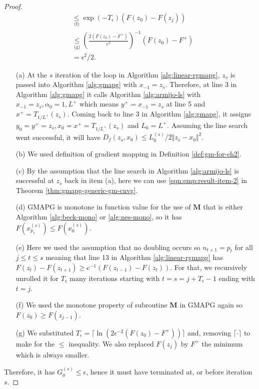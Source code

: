\documentclass[12pt]{report}
\begin{document}
\begin{proof}
{\begin{align*}
                &\underset{\text{(f)}}{\le} \exp(-T_\epsilon)(F(z_{0}) - F(z_j))
                \\
                &\underset{\text{(g)}}{\le} \left(
                    \frac{2(F(z_0) - F^+)}{\epsilon^2}
                \right)^{-1}(F(z_0) - F^+) 
                \\
                &= \epsilon^2/2.
            \end{align*}
            }
            \begin{enumerate}
                \item [(a)] At the $s$ iteration of the loop in Algorithm \ref{alg:linear-rgmapg}, $z_s$ is passed into Algorithm \ref{alg:gmapg} with $x_{-1} = z_s$. Therefore, at line 3 in Algorithm \ref{alg:gmapg} it calls Algorithm \ref{alg:armijo-ls} with $x_{-1} = z_s, \alpha_0 = 1, L^+$ which means $y^+ = x_{-1} = z_s$ at line 5 and $x^+ = T_{1/L^+}(z_s)$. Coming back to line 3 in Algorithm \ref{alg:gmapg}, it assigns $y_0 = y^+ = z_s, x_0 = x^+ = T_{1/L^+}(z_s)$ and $L_0 = L^+$. Assuming the line search went successful, it will have $D_f(z_s, x_0) \le L^{(s)}_0/2 \Vert z_s - x_0\Vert^2$. 
                \item [(b)] We used definition of gradient mapping in Definition \ref{def:gm-for-ch2}. 
                \item [(c)] By the assumption that the line search in Algorithm \ref{alg:armijo-ls} is successful at $z_s$ back in item (a), here we can use \eqref{eqn:emp:result-item-2} in Theorem \ref{thm:gmapg-generic-gm-cnvg}. 
                \item [(d)] GMAPG is monotone in function value for the use of $\mathbf M$ that is either Algorithm \ref{alg:beck-mono} or \ref{alg:nes-mono}, so it has $F\left(x_{p_s}^{(s)}\right) \le F\left(x_0^{(s)}\right)$. 
                \item [(e)] Here we used the assumption that no doubling occurs so $n_{t + 1} = p_t$ for all $j \le t \le s$ meaning that line 13 in Algorithm \ref{alg:linear-rgmapg} has $F(z_t) - F(z_{t + 1}) \ge e^{-1}(F(z_{t - 1}) - F(z_t))$. For that, we recursively unrolled it for $T_\epsilon$ many iterations starting with $t = s = j + T_\epsilon - 1$ ending with $t = j$. 
                \item [(f)] We used the monotone property of subroutine $\mathbf M$ in GMAPG again so $F(z_0) \ge F(z_{j - 1})$. 
                \item [(g)] We substituted $T_\epsilon = \lceil\ln(2\epsilon^{-2}(F(z_0) - F^+))\rceil$ and, removing $\lceil\cdot\rceil$ to make for the $\le$ inequality. We also replaced $F(z_j)$ by $F^+$ the minimum which is always smaller. 
            \end{enumerate}
            Therefore, it has $G_0^{(s)} \le \epsilon$, hence it must have terminated at, or before iteration $s$. 
        \end{proof}
\end{document}
